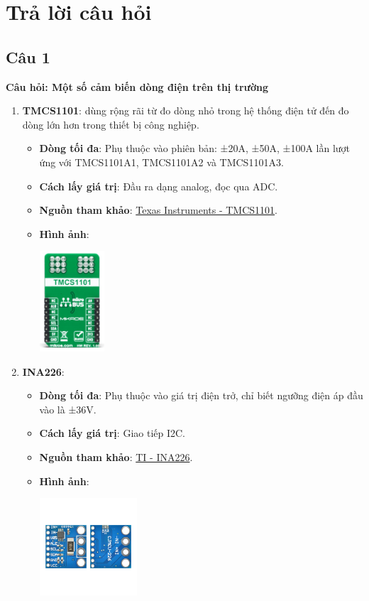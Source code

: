 \section{Trả lời câu hỏi}
\subsection{Câu 1}
\textbf{Câu hỏi: Một số cảm biến dòng điện trên thị trường}

\begin{enumerate}
    \item \textbf{TMCS1101}: dùng rộng rãi từ đo dòng nhỏ trong hệ thống điện tử đến đo dòng lớn hơn trong thiết bị công nghiệp.
    \begin{itemize}
        \item \textbf{Dòng tối đa}: Phụ thuộc vào phiên bản: ±20A, ±50A, ±100A lần lượt ứng với TMCS1101A1, TMCS1101A2 và TMCS1101A3.
        \item \textbf{Cách lấy giá trị}: Đầu ra dạng analog, đọc qua ADC.
        \item \textbf{Nguồn tham khảo}: \href{https://www.ti.com/product/TMCS1101}{Texas Instruments - TMCS1101}.
        \item \textbf{Hình ảnh}:
        \begin{center}
            \includegraphics[width=0.2\textwidth]{graphics/section5/tmcs1101.png}
        \end{center}
    \end{itemize}

    \item \textbf{INA226}:
    \begin{itemize}
        \item \textbf{Dòng tối đa}: Phụ thuộc vào giá trị điện trở, chỉ biết ngưỡng điện áp đầu vào là ±36V.
        \item \textbf{Cách lấy giá trị}: Giao tiếp I2C.
        \item \textbf{Nguồn tham khảo}: \href{https://www.ti.com/product/INA226}{TI - INA226}.
        \item \textbf{Hình ảnh}:
        \begin{center}
            \includegraphics[width=0.3\textwidth]{graphics/section5/ina226.png}
        \end{center}
    \end{itemize}


\end{enumerate}
